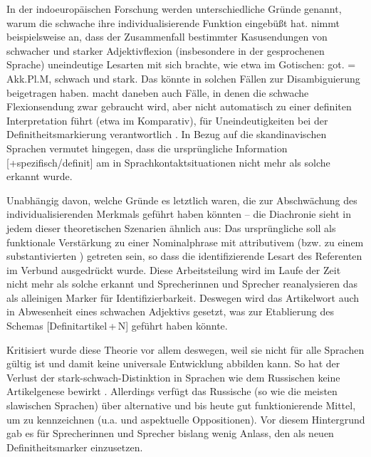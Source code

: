 In der indoeuropäischen Forschung werden unterschiedliche Gründe genannt, warum die schwache  ihre individualisierende Funktion eingebüßt hat. \textcite[24]{Kovari1984} nimmt beispielsweise an, dass der Zusammenfall bestimmter Kasusendungen  von schwacher und starker Adjektivflexion (insbesondere in der gesprochenen Sprache) uneindeutige Lesarten mit sich brachte, wie etwa im Gotischen: got.  = Akk.Pl.M, schwach und stark. Das  könnte in solchen Fällen zur Disambiguierung beigetragen haben.
\textcite[44]{Ebert1978} macht daneben \parencite[mit Verweis auf][]{Kuhn1955} auch Fälle, in denen die schwache Flexionsendung zwar gebraucht wird, aber nicht automatisch zu einer definiten Interpretation führt (etwa im Komparativ), für Uneindeutigkeiten bei der Definitheitsmarkierung  verantwortlich \parencite[vgl. zu dieser Argumentation auch][25]{Kovari1984}. In Bezug auf die skandinavischen Sprachen vermutet \textcite{Braunmuller2013} hingegen, dass die ursprüngliche Information [+spezifisch/definit] am  in Sprachkontaktsituationen nicht mehr als solche erkannt wurde. 

Unabhängig davon, welche Gründe es letztlich waren, die zur Abschwächung des individualisierenden Merkmals geführt haben könnten -- die Diachronie sieht in jedem dieser theoretischen Szenarien ähnlich aus: Das ursprüngliche  soll als funktionale Verstärkung zu einer Nominalphrase  mit attributivem  (bzw. zu einem substantivierten  ) getreten sein, so dass die identifizierende Lesart des Referenten im Verbund ausgedrückt wurde. Diese Arbeitsteilung wird im Laufe der Zeit nicht mehr als solche erkannt und Sprecherinnen und Sprecher reanalysieren  das  als alleinigen Marker für Identifizierbarkeit. Deswegen wird das Artikelwort auch in Abwesenheit eines schwachen Adjektivs gesetzt, was zur Etablierung des Schemas  [Definitartikel\,+\,N]  geführt haben könnte.     

Kritisiert wurde diese Theorie vor allem deswegen, weil sie nicht für alle Sprachen gültig ist und damit keine universale Entwicklung abbilden kann. So hat der Verlust der stark-schwach-Distinktion in Sprachen wie dem Russischen keine Artikelgenese bewirkt \parencite[][64]{Philippi1997}. Allerdings verfügt das Russische (so wie die meisten slawischen Sprachen) über alternative und bis heute gut funktionierende Mittel, um  zu kennzeichnen (u.a.  und aspektuelle  Oppositionen). Vor diesem Hintergrund gab es für Sprecherinnen und Sprecher bislang wenig Anlass,  den  als neuen Definitheitsmarker  einzusetzen.

